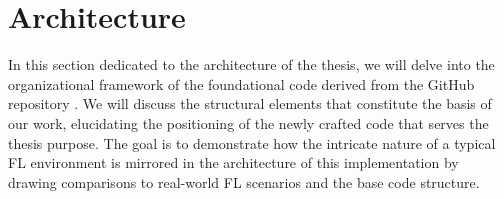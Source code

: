 \section{Architecture}\label{sec:architecture}
In this section dedicated to the architecture of the thesis, we will delve into the organizational framework of the foundational code derived from the GitHub repository \cite{LFighter_code}. We will discuss the structural elements that constitute the basis of our work, elucidating the positioning of the newly crafted code that serves the thesis purpose. The goal is to demonstrate how the intricate nature of a typical FL environment is mirrored in the architecture of this implementation by drawing comparisons to real-world FL scenarios and the base code structure.

